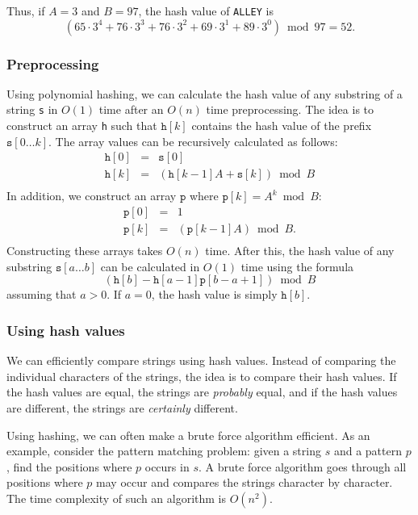 Thus, if $A=3$ and $B=97$, the hash value
of \texttt{ALLEY} is
\[(65 \cdot 3^4 + 76 \cdot 3^3 + 76 \cdot 3^2 + 69 \cdot 3^1 + 89 \cdot 3^0) \bmod 97 = 52.\]

\subsubsection*{Preprocessing}

Using polynomial hashing, we can calculate the hash value of any substring
of a string \texttt{s} in $O(1)$ time after an $O(n)$ time preprocessing.
The idea is to construct an array \texttt{h} such that
$\texttt{h}[k]$ contains the hash value of the prefix $\texttt{s}[0 \ldots k]$.
The array values can be recursively calculated as follows:
\[
    \begin{array}{lcl}
        \texttt{h}[0] & = & \texttt{s}[0]                               \\
        \texttt{h}[k] & = & (\texttt{h}[k-1] A + \texttt{s}[k]) \bmod B \\
    \end{array}
\]
In addition, we construct an array $\texttt{p}$
where $\texttt{p}[k]=A^k \bmod B$:
\[
    \begin{array}{lcl}
        \texttt{p}[0] & = & 1                            \\
        \texttt{p}[k] & = & (\texttt{p}[k-1] A) \bmod B. \\
    \end{array}
\]
Constructing these arrays takes $O(n)$ time.
After this, the hash value of any substring
$\texttt{s}[a \ldots b]$
can be calculated in $O(1)$ time using the formula
\[(\texttt{h}[b]-\texttt{h}[a-1] \texttt{p}[b-a+1]) \bmod B\]
assuming that $a>0$.
If $a=0$, the hash value is simply $\texttt{h}[b]$.

\subsubsection*{Using hash values}

We can efficiently compare strings using hash values.
Instead of comparing the individual characters of the strings,
the idea is to compare their hash values.
If the hash values are equal,
the strings are \emph{probably} equal,
and if the hash values are different,
the strings are \emph{certainly} different.

Using hashing, we can often make a brute force
algorithm efficient.
As an example, consider the pattern matching problem:
given a string $s$ and a pattern $p$,
find the positions where $p$ occurs in $s$.
A brute force algorithm goes through all positions
where $p$ may occur and compares the strings
character by character.
The time complexity of such an algorithm is $O(n^2)$.

